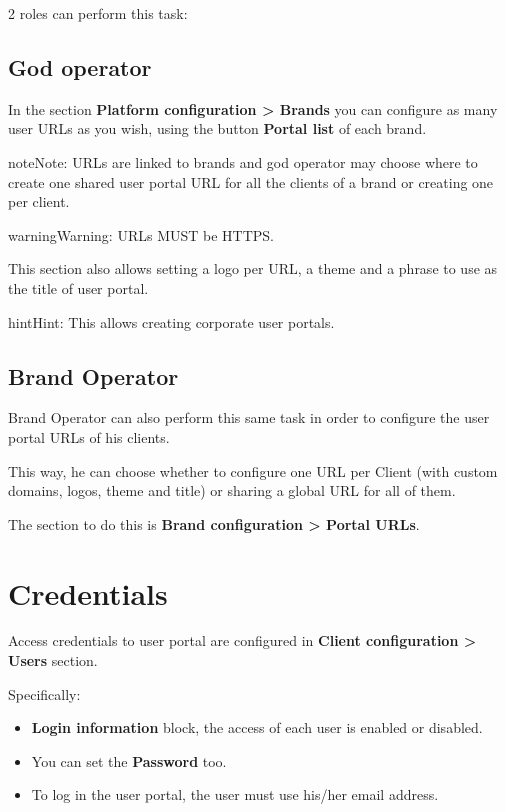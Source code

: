 \documentclass[letterpaper,10pt,english]{sphinxmanual}
\begin{document}
2 roles can perform this task:


\subsection{God operator}
\label{user_portal/urls:god-operator}
In the section \textbf{Platform configuration \textgreater{} Brands} you can configure as many
user URLs as you wish, using the button \textbf{Portal list} of each brand.

\begin{notice}{note}{Note:}
URLs are linked to brands and god operator may choose where to create
one shared user portal URL for all the clients of a brand or creating
one per client.
\end{notice}

\begin{notice}{warning}{Warning:}
URLs MUST be HTTPS.
\end{notice}

This section also allows setting a logo per URL, a theme and a phrase to use as
the title of user portal.

\begin{notice}{hint}{Hint:}
This allows creating corporate user portals.
\end{notice}


\subsection{Brand Operator}
\label{user_portal/urls:brand-operator}
Brand Operator can also perform this same task in order to configure the user
portal URLs of his clients.

This way, he can choose whether to configure one URL per Client (with custom
domains, logos, theme and title) or sharing a global URL for all of them.

The section to do this is \textbf{Brand configuration \textgreater{} Portal URLs}.


\section{Credentials}
\label{user_portal/credentials:credentials}\label{user_portal/credentials::doc}
Access credentials to user portal are configured in \textbf{Client configuration \textgreater{}
Users} section.

Specifically:
\begin{itemize}
\item {} 
\textbf{Login information} block, the access of each user is enabled or disabled.

\item {} 
You can set the \textbf{Password} too.

\item {} 
To log in the user portal, the user must use his/her email address.

\end{itemize}
\end{document}
